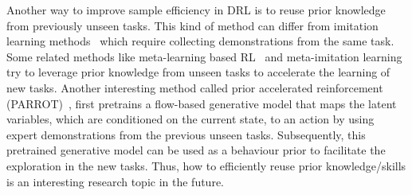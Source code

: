 Another way to improve sample efficiency in DRL is to reuse prior knowledge from previously unseen tasks. This kind of method can differ from imitation learning methods~\cite{bojarski2016end,xu2017end,torabi2018behavioral} which require collecting demonstrations from the same task. Some related methods like meta-learning based RL~\cite{duan2016rl,wang2017learning,finn2017model} and meta-imitation learning~\cite{duan2017one,finn2017one,huang2019continuous} try to leverage prior knowledge from unseen tasks to accelerate the learning of new tasks. Another interesting method called prior accelerated reinforcement (PARROT)~\cite{singh2020parrot}, first pretrains a flow-based generative model that maps the latent variables, which are conditioned on the current state, to an action by using expert demonstrations from the previous unseen tasks. Subsequently, this pretrained generative model can be used as a behaviour prior to facilitate the exploration in the new tasks. Thus, how to efficiently reuse prior knowledge/skills is an interesting research topic in the future.

